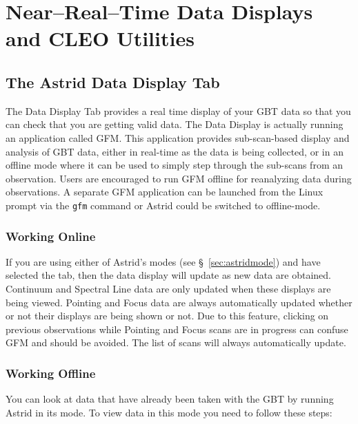\chapter{Near--Real--Time Data Displays and CLEO Utilities}\label{chap:datadisplay}
 
\section{The Astrid Data Display Tab}
 
The Data Display Tab provides a real time display of your \gls{GBT} data
so that you can check that you are getting valid data.  The Data
Display is actually running an application called
\gls{GFM}.  This application provides sub-scan-based
display and analysis of \gls{GBT} data, either in real-time as the data is
being collected, or in an offline mode where it can be used to simply
step through the sub-scans from an observation.  Users are encouraged
to run \gls{GFM} offline for reanalyzing data during observations.  A
separate \gls{GFM} application can be launched from the Linux prompt via the
{\tt gfm} command or \gls{Astrid} could be switched to offline-mode.

\subsection{Working Online}

If you are using either of \gls{Astrid}'s  modes (see \S~\ref{sec:astridmode})
and have selected the  tab, then the data display will update as new data
are obtained. Continuum and Spectral Line data are only updated when these displays are
being viewed. Pointing and Focus data are always automatically updated whether or not
their displays are being shown or not.  Due to this feature, clicking on previous
observations while Pointing and Focus scans are in progress can confuse \gls{GFM} and
should be avoided.  The list of scans will always automatically update.

\subsection{Working Offline}\label{sec:workingOffline}

You can look at data that have already been taken with the \gls{GBT} by running \gls{Astrid} in
its  mode. To view data in this mode you need to follow these steps:

